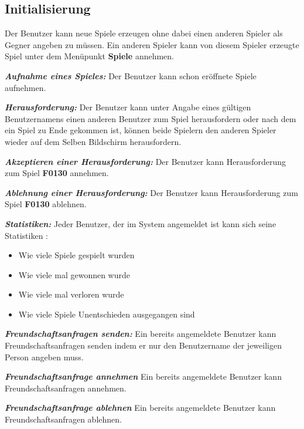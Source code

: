 \documentclass[parskip=full]{scrartcl}
\begin{document}
\subsection{Initialisierung}
\begin{description}
	\hypertarget{F2010}{\item[F2010]} Der Benutzer kann neue Spiele erzeugen ohne dabei einen anderen \gls{Spieler} als Gegner angeben zu müssen. Ein anderen Spieler kann von diesem Spieler erzeugte Spiel unter dem Menüpunkt \textbf{Spiele} annehmen.
	\item[F2020] \textbf{\textit{Aufnahme eines Spieles: }} Der Benutzer kann schon eröffnete Spiele aufnehmen.
	\item[F2030] \textbf{\textit{Herausforderung: }} Der Benutzer kann unter Angabe eines gültigen Benutzernamens einen anderen Benutzer zum Spiel herausfordern oder nach dem ein Spiel zu Ende gekommen ist, können beide Spielern den anderen Spieler wieder auf dem Selben Bildschirm herausfordern.
	\item [F2040] \textbf{\textit{Akzeptieren einer Herausforderung: }} Der Benutzer kann Herausforderung zum Spiel \textbf{F0130} annehmen.
	\item [F2050] \textbf{\textit{Ablehnung einer Herausforderung: }} Der Benutzer kann Herausforderung zum Spiel \textbf{F0130} ablehnen.
	\item [F2060] \textbf{\textit{Statistiken: }} Jeder Benutzer, der im System angemeldet ist kann sich seine Statistiken :
	\begin{itemize}
		\item Wie viele Spiele gespielt wurden
		\item Wie viele mal gewonnen wurde
		\item Wie viele mal verloren wurde
		\item Wie viele Spiele Unentschieden ausgegangen sind
	\end{itemize}
	\item[F2070] \textbf{\textit{Freundschaftsanfragen senden: }}
	Ein bereits angemeldete Benutzer kann Freundschaftsanfragen senden indem er nur den Benutzername der jeweiligen Person angeben muss.
	\item[F2080] \textbf{\textit{Freundschaftsanfrage annehmen }} Ein bereits angemeldete Benutzer kann Freundschaftsanfragen annehmen.
	\item[F2090] \textbf{\textit{Freundschaftsanfrage ablehnen }} Ein bereits angemeldete Benutzer kann Freundschaftsanfragen ablehnen.
	
\end{description}
\end{document}
